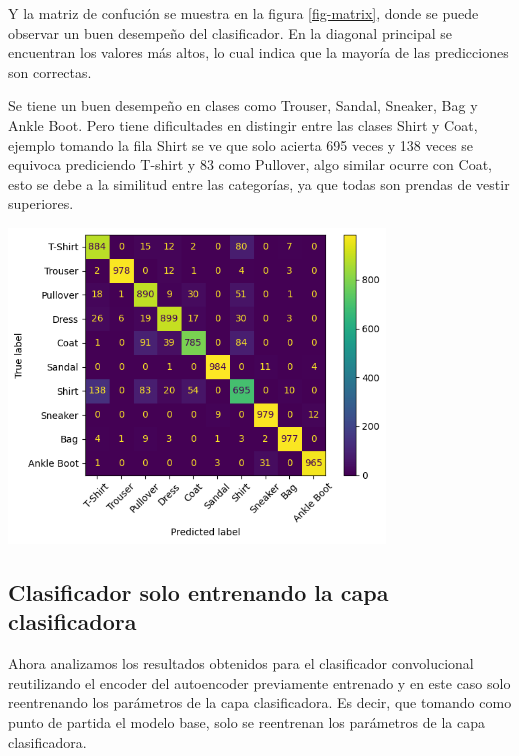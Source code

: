 \documentclass[aps,prl,reprint,groupedaddress]{revtex4-2}
\newenvironment{Figura}
  {\par\medskip\noindent\minipage{\linewidth}}
  {\endminipage\par\medskip}
\begin{document}
Y la matriz de confución se muestra en la figura \ref{fig-matrix}, donde se 
puede observar un buen desempeño del clasificador. En la diagonal principal se
encuentran los valores más altos, lo cual indica que la mayoría de las
predicciones son correctas. 

Se tiene un buen desempeño en clases como Trouser, Sandal, Sneaker, Bag y Ankle
Boot. Pero tiene dificultades en distingir entre las clases Shirt y Coat, 
ejemplo tomando la fila Shirt se ve que solo acierta 695 veces y 138 veces se 
equivoca prediciendo T-shirt y 83 como Pullover, algo similar ocurre con Coat, 
esto se debe a la similitud entre las categorías, ya que todas son prendas de 
vestir superiores.
\begin{Figura}
  \centering
  \includegraphics[width=0.75\textwidth]{figs1/matrix_confuncion_modelo_con_clasificador.png}
  \label{fig-matrix}
\end{Figura}

\subsection{Clasificador solo entrenando la capa clasificadora}

Ahora analizamos los resultados obtenidos para el clasificador convolucional
reutilizando el encoder del autoencoder previamente entrenado y en este caso
solo reentrenando los parámetros de la capa clasificadora. Es decir, que 
tomando como punto de partida el modelo base, solo se reentrenan los parámetros
de la capa clasificadora.
\end{document}
